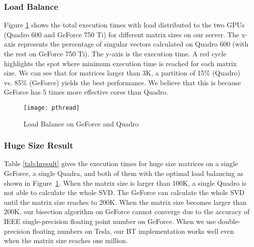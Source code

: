 \subsubsection{Load Balance}
Figure \ref{fig:pthread} shows the total execution times with load distributed to the two GPUs
(Quadro 600 and GeForce 750 Ti) for different matrix sizes on our server.
The x-axis represents the percentage of singular vectors calculated on Quadro 600 (with the rest on GeForce 750 Ti).
The y-axis is the execution time.
A red cycle
highlights the spot where minimum execution time is reached
for each matrix size. We can see that for matrices larger than
3K, a partition of 15\% (Quadro) vs. 85\% (GeForce) yields the
best performance. We believe that this is because 
GeForce has 5 times more effective cores than Quadro.
\begin{figure}[hbpt]
\centering
\texttt{[image: pthread]}
\caption{Load Balance on GeForce and Quadro}
\label{fig:pthread}
\vspace{-0.15in}
\end{figure}

\subsubsection{Huge Size Result}
Table \ref{tab:hresult} gives the execution times for huge size matrices on a single GeForce, a single Quadra, and both of them with the optimal load balancing as shown in Figure~\ref{fig:pthread}.
When the matrix size is larger than 100K, a single Quadro is not able to calculate the whole SVD.
The GeForce can calculate the whole SVD until the matrix size reaches to 200K.
When the matrix size becomes larger than 200K, our bisection algorithm on GeForce cannot converge due to the accuracy of IEEE single-precision floating point number on GeForce.
When we use double-precision floating numbers on Tesla, our BT implementation works well even when the matrix size reaches one million.

